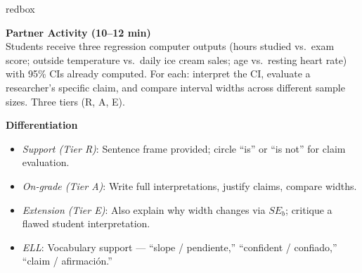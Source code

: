 \documentclass[10pt]{article}
\begin{document}
\begin{skillbox}{redbox}
\begin{minipage}[t]{0.48\linewidth}
    \textbf{Partner Activity (10--12 min)}\\
    Students receive three regression computer outputs (hours studied vs.\ exam score;
    outside temperature vs.\ daily ice cream sales; age vs.\ resting heart rate) with 95\%
    CIs already computed. For each: interpret the CI, evaluate a researcher's specific claim,
    and compare interval widths across different sample sizes. Three tiers (R, A, E).
\end{minipage}
\hfill
\begin{minipage}[t]{0.48\linewidth}
    \textbf{Differentiation}
    \begin{itemize}
        \item \textit{Support (Tier R)}: Sentence frame provided; circle ``is'' or ``is not''
              for claim evaluation.
        \item \textit{On-grade (Tier A)}: Write full interpretations, justify claims, compare
              widths.
        \item \textit{Extension (Tier E)}: Also explain why width changes via $SE_b$; critique
              a flawed student interpretation.
        \item \textit{ELL}: Vocabulary support --- ``slope / pendiente,'' ``confident /
              confiado,'' ``claim / afirmaci\'{o}n.''
    \end{itemize}
\end{minipage}
\end{skillbox}
\end{document}
